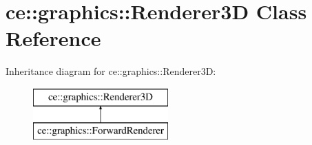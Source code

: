 \hypertarget{classce_1_1graphics_1_1_renderer3_d}{}\section{ce\+:\+:graphics\+:\+:Renderer3D Class Reference}
\label{classce_1_1graphics_1_1_renderer3_d}
Inheritance diagram for ce\+:\+:graphics\+:\+:Renderer3D\+:\begin{figure}[H]
\begin{center}
\leavevmode
\includegraphics[height=2.000000cm]{classce_1_1graphics_1_1_renderer3_d}
\end{center}
\end{figure}
